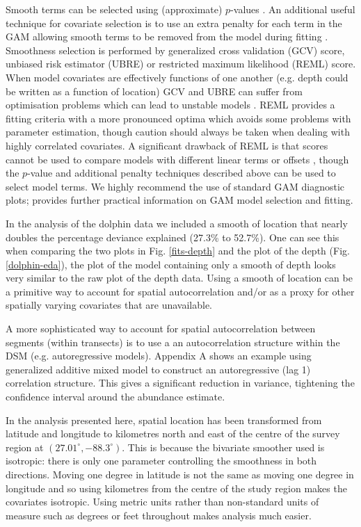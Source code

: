 \documentclass[a4paper,12pt]{article}
\begin{document}
Smooth terms can be selected using (approximate) $p$-values \cite[][Section 4.8.5]{Wood:2006wz}. An additional useful technique for covariate selection is to use an extra penalty for each term in the GAM allowing smooth terms to be removed from the model during fitting \citep[illustrated in Appendix A;][]{Wood:ub}. Smoothness selection is performed by generalized cross validation (GCV) score, unbiased risk estimator (UBRE) or restricted maximum likelihood (REML) score. When model covariates are effectively functions of one another (e.g. depth could be written as a function of location) GCV and UBRE can suffer from optimisation problems \cite[][Section 4.5.3]{Wood:2006wz} which can lead to unstable models \citep[][]{Wood:ub}. REML provides a fitting criteria with a more pronounced optima which avoids some problems with parameter estimation, though caution should always be taken when dealing with highly correlated covariates. A significant drawback of REML is that scores cannot be used to compare models with different linear terms or offsets \cite[][]{Wood:ub}, though the $p$-value and additional penalty techniques described above can be used to select model terms. We highly recommend the use of standard GAM diagnostic plots; \cite{Wood:2006wz} provides further practical information on GAM model selection and fitting.

In the analysis of the dolphin data we included a smooth of location that nearly doubles the percentage deviance explained (27.3\% to 52.7\%). One can see this when comparing the two plots in Fig. \ref{fits-depth} and the plot of the depth (Fig. \ref{dolphin-eda}), the plot of the model containing only a smooth of depth looks very similar to the raw plot of the depth data. Using a smooth of location can be a primitive way to account for spatial autocorrelation and/or as a proxy for other spatially varying covariates that are unavailable. 

A more sophisticated way to account for spatial autocorrelation between segments (within transects) is to use a an autocorrelation structure within the DSM (e.g. autoregressive models). Appendix A shows an example using generalized additive mixed model \cite[GAMMs;][Section 6.6, see Appendix A for an example]{Wood:2006wz} to construct an autoregressive (lag 1) correlation structure. This gives a significant reduction in variance, tightening the confidence interval around the abundance estimate.

In the analysis presented here, spatial location has been transformed from latitude and longitude to kilometres north and east of the centre of the survey region at $(27.01^\circ, -88.3^\circ)$. This is because the bivariate smoother used \citep[the thin plate spline;][]{Wood:2003tc} is isotropic: there is only one parameter controlling the smoothness in both directions. Moving one degree in latitude is not the same as moving one degree in longitude and so using kilometres from the centre of the study region makes the covariates isotropic. Using metric units rather than non-standard units of measure such as degrees or feet throughout makes analysis much easier.
\end{document}
